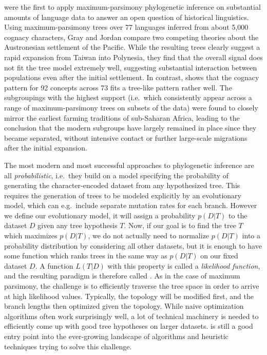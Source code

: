 \citet{gray_jordan_2000} were the first to apply maximum-parsimony phylogenetic inference on substantial amounts of language data to answer an open question of historical linguistics. Using maximum-parsimony trees over 77 languages inferred from about 5,000 cognacy characters, Gray and Jordan compare two competing theories about the Austronesian settlement of the Pacific. While the resulting trees clearly suggest a rapid expansion from Taiwan into Polynesia, they find that the overall signal does not fit the tree model extremely well, suggesting substantial interaction between populations even after the initial settlement. In contrast, \citet{holden2002} shows that the cognacy pattern for 92 concepts across 73  fits a tree-like pattern rather well. The subgroupings with the highest support (i.e.\ which consistently appear across a range of maximum-parsimony trees on subsets of the data) were found to closely mirror the earliest farming traditions of sub-Saharan Africa, leading to the conclusion that the modern subgroups have largely remained in place since they became separated, without intensive contact or further large-scale migrations after the initial expansion.

The most modern and most successful approaches to phylogenetic inference are all \textit{probabilistic}, i.e.\ they build on a model specifying the probability of generating the character-encoded dataset from any hypothesized tree. This requires the generation of trees to be modeled explicitly by an evolutionary model, which can e.g.\ include separate mutation rates for each branch. However we define our evolutionary model, it will assign a probability $p(D|T)$ to the dataset $D$ given any tree hypothesis $T$. Now, if our goal is to find the tree $T$ which maximizes $p(D|T)$, we do not actually need to normalize $p(D|T)$ into a probability distribution by considering all other datasets, but it is enough to have some function which ranks trees in the same way as $p(D|T)$ on our fixed dataset $D$. A function $L(T|D)$ with this property is called a \textit{likelihood function}, and the resulting paradigm is therefore called \textit{}. As in the case of maximum parsimony, the challenge is 
to efficiently traverse the tree space in order to arrive at high likelihood values. Typically, the topology will be modified first, and the branch lengths then optimized given the topology. While naive optimization algorithms often work surprisingly well, a lot of technical machinery is needed to efficiently come up with good tree hypotheses on larger datasets. \citet[Ch. 16]{felsenstein2004} is still a good entry point into the ever-growing landscape of algorithms and heuristic techniques trying to solve this challenge.

